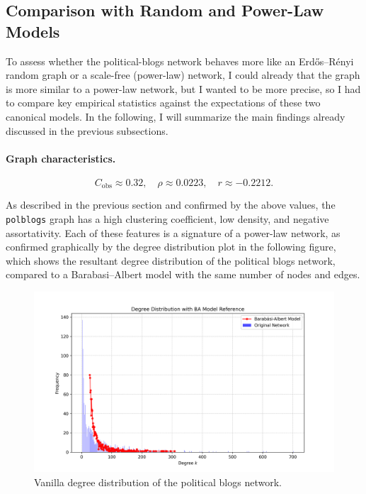 \documentclass{article}
\begin{document}

\subsection{Comparison with Random and Power-Law Models}
\label{sec:model-comparison}
To assess whether the political-blogs network behaves more like an Erdős–Rényi random graph or a scale-free (power-law) network, I could already that the graph is more similar to a power-law network, but I wanted to be more precise, so I had to compare key empirical statistics against the expectations of these two canonical models. In the following, I will summarize the main findings already discussed in the previous subsections.

\paragraph{Graph characteristics.}
\[
  C_{\mathrm{obs}} \approx 0.32,\quad
  \rho \approx 0.0223,\quad
  r \approx -0.2212.
\]

As described in the previous section and confirmed by the above values, the \texttt{polblogs} graph has a high clustering coefficient, low density, and negative assortativity.
Each of these features is a signature of a power-law network, as confirmed graphically by the degree distribution plot in the following figure, which shows the resultant degree distribution of the political blogs network, compared to a Barabasi–Albert model with the same number of nodes and edges. 

\begin{figure}[H]
  \centering
  \includegraphics[width=1\textwidth]{../images/degree_distribution.png}
  \caption{Vanilla degree distribution of the political blogs network.}
  \label{fig:degree-dist}
\end{figure}
\end{document}
